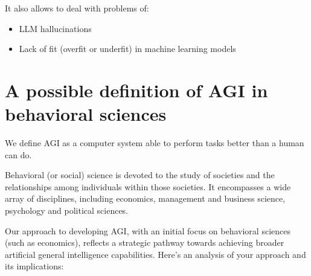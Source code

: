 \documentclass[11pt, reqno]{amsart}
\theoremstyle{definition}
\theoremstyle{remark}
\begin{document}
  It also allows to deal with problems of:
  \begin{itemize}
    \item LLM hallucinations

    \item Lack of fit (overfit or underfit) in machine learning models
  \end{itemize}

  \section{A possible definition of AGI in behavioral sciences}

  We define AGI as a computer system able to perform tasks better than a human
  can do.

  Behavioral (or social) science is devoted to the study of societies and the
  relationships among individuals within those societies. It encompasses a wide
  array of disciplines, including economics, management and business science,
  psychology and political sciences.

  Our approach to developing AGI, with an initial focus on behavioral sciences
  (such as economics), reflects a strategic pathway towards achieving
  broader artificial general intelligence capabilities. Here's an analysis of
  your approach and its implications:
\end{document}
